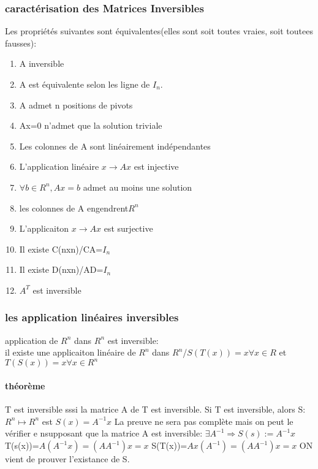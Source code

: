 \documentclass[a4paper,10pt]{article}
\begin{document}
\subsubsection{caractérisation des Matrices Inversibles}
Les propriétés suivantes sont équivalentes(elles sont soit toutes vraies, soit toutees fausses):
\begin{enumerate}
 \item A inversible
 \item A est équivalente selon les ligne de $I_n$.
 \item A admet n positions de pivots
 \item Ax=0 n'admet que la solution triviale
 \item Les colonnes de A sont linéairement indépendantes
 \item L'application linéaire $x\rightarrow Ax$ est injective
 \item $\forall b\in R^n,Ax=b$ admet au moins une solution
 \item les colonnes de A engendrent$R^n$
 \item L'applicaiton $x\rightarrow Ax$ est surjective
 \item Il existe C(nxn)/CA=$I_n$
 \item Il existe D(nxn)/AD=$I_n$
 \item $A^T$ est inversible
\end{enumerate}
\subsubsection{les application linéaires inversibles}
\begin{description}
 \item application de $R^n$ dans $R^n$ est inversible:\\{il existe une applicaiton linéaire de $R^n$ dans $R^n$/$S(T(x))=x\forall x\in R$ et $T(S(x))=x\forall x\in R^n$}
\end{description}
\paragraph{théorème}
T est inversible sssi la matrice A de T est inversible. Si T est inversible, alors S:$R^n\mapsto R^n$ est $S(x)=A^{-1}x$
\newline
La preuve ne sera pas complète mais on peut le vérifier e nsupposant que la matrice A est inversible:
\newline
$\exists A^{-1}\Rightarrow S(s):=A^{-1}x$
\newline
T(s(x))=$A(A^{-1}x)=(AA^{-1})x=x$
\newline
S(T(x))=$Ax(A^{-1})=(AA^{-1})x=x$
\newline
ON vient de prouver l'existance de S.
\end{document}
